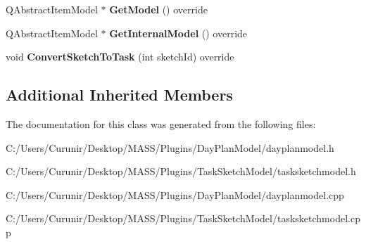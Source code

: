 \begin{DoxyCompactItemize}
\item 
\mbox{\label{class_task_sketch_model_a0dd67cee0f8226875afb1d2a6ad149ac}} 
Q\+Abstract\+Item\+Model $\ast$ {\bfseries Get\+Model} () override
\item 
\mbox{\label{class_task_sketch_model_a0a4c037dc96fdc0aa7aaa5353d5a95d9}} 
Q\+Abstract\+Item\+Model $\ast$ {\bfseries Get\+Internal\+Model} () override
\item 
\mbox{\label{class_task_sketch_model_ab347bbadaee4f9f5bb29964ca95377bc}} 
void {\bfseries Convert\+Sketch\+To\+Task} (int sketch\+Id) override
\end{DoxyCompactItemize}
\subsection*{Additional Inherited Members}


The documentation for this class was generated from the following files\+:\begin{DoxyCompactItemize}
\item 
C\+:/\+Users/\+Curunir/\+Desktop/\+M\+A\+S\+S/\+Plugins/\+Day\+Plan\+Model/dayplanmodel.\+h\item 
C\+:/\+Users/\+Curunir/\+Desktop/\+M\+A\+S\+S/\+Plugins/\+Task\+Sketch\+Model/tasksketchmodel.\+h\item 
C\+:/\+Users/\+Curunir/\+Desktop/\+M\+A\+S\+S/\+Plugins/\+Day\+Plan\+Model/dayplanmodel.\+cpp\item 
C\+:/\+Users/\+Curunir/\+Desktop/\+M\+A\+S\+S/\+Plugins/\+Task\+Sketch\+Model/tasksketchmodel.\+cpp\end{DoxyCompactItemize}

